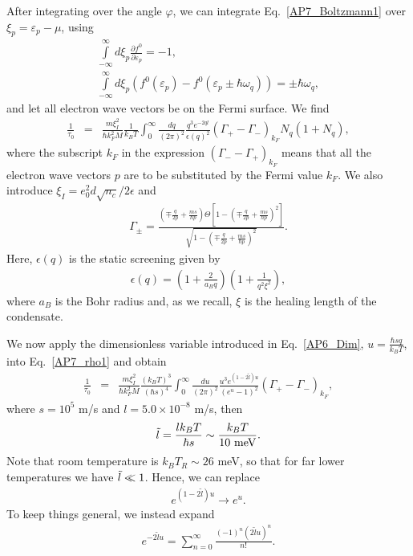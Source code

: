 After integrating over the angle $\varphi$, we can integrate Eq.~\eqref{AP7_Boltzmann1} over $\xi_p=\varepsilon_p-\mu$, using
%
\begin{eqnarray}
\int\limits_{-\infty}^{\infty}d\xi_p\frac{\partial f^0}{\partial \varepsilon_p}=-1,\nonumber\\
\int\limits_{-\infty}^{\infty}d\xi_p\left(f^0(\varepsilon_p)-f^0(\varepsilon_{p}\pm\hbar\omega_q)\right)=\pm\hbar\omega_q,
\end{eqnarray}
%
and let all electron wave vectors be on the Fermi surface.
%
We find
%
\begin{eqnarray}
\label{AP7_rho1}
\frac{1}{\tau_0}&=&\frac{m\xi_I^2}{\hbar k_F^2M}\frac{1}{k_BT}\int_0^\infty \frac{dq}{(2\pi)^2} \frac{q^3e^{-2ql}}{\epsilon(q)^2}(\Gamma_+-\Gamma_-)_{k_F}N_q(1+N_q),
\end{eqnarray}
%
where the subscript $k_F$ in the expression $(\Gamma_--\Gamma_+)_{k_F}$ means that all the electron wave vectors $p$ are to be substituted by the Fermi value $k_F$.
We also
introduce $\xi_I= e_0^2d\sqrt{n_c}/2\epsilon$ and
%
\begin{eqnarray}
\label{AP7_gamma}
\Gamma_{\pm}=\frac{\left(\mp\frac{q}{2p}+\frac{ms}{\hbar p}\right)\Theta\left[1-\left(\mp\frac{q}{2p}+\frac{ms}{\hbar p}\right)^2\right]}{\sqrt{1-\left(\mp\frac{q}{2p}+\frac{ms}{\hbar p}\right)^2}}.
\end{eqnarray}
%
Here, $\epsilon(q)$ is the static screening given by
%
\begin{eqnarray}
\epsilon(q)=\left(1+\frac{2}{a_Bq}\right)\left(1+\frac{1}{q^2\xi^2}\right),
\end{eqnarray}
%
where $a_B$ is the Bohr radius and, as we recall, $\xi$ is the healing length of the condensate.

We now apply the dimensionless variable introduced in Eq.~\eqref{AP6_Dim},
$u=\frac{\hbar sq}{k_BT}$, into Eq.~\eqref{AP7_rho1} and obtain
%
\begin{eqnarray}
\label{AP7_rho2}
\frac{1}{\tau_0}&=&\frac{m\xi_I^2}{\hbar k_F^2M}\frac{(k_BT)^3}{(\hbar s)^4}\int_0^\infty \frac{du}{(2\pi)^2} \frac{u^3e^{(1-2\tilde{l})u}}{(e^u-1)^2}(\Gamma_+-\Gamma_-)_{k_F},
\end{eqnarray}
%
where $s=10^5$ m/s and $l= 5.0\times 10^{-8}$ m/s, then
%
\begin{eqnarray}
\Tilde{l}=\frac{lk_BT}{\hbar s}\sim\frac{k_BT}{10\mbox{ meV}}.
\end{eqnarray}
%
Note that room temperature is $k_BT_R\sim 26$ meV, so that for far lower temperatures we have $\Tilde{l}\ll 1$.
Hence, we can replace
%
\begin{eqnarray}
\label{AP7_approx1}
e^{(1-2\tilde{l})u}\rightarrow e^u.
\end{eqnarray}
%
%
To keep things general, we instead expand
\begin{eqnarray}
\label{AP7_taylor}
e^{-2\tilde{l}u}=\sum_{n=0}^\infty\frac{(-1)^n(2\tilde{l}u)^n}{n!}.
\end{eqnarray}

